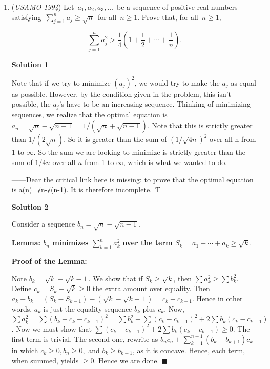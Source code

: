 \begin{enumerate}
 

 Because $CD=EF$ and $C$,$D$,$E$ and $F$ all lie on the circle, $CF$ is parallel to $DE$. So, $\triangle CPQ$ and $\triangle EPD$ are similar, and $CQ/DE=CP/PE$.

 Putting it all together, $\frac{CP}{PE}=\frac{CQ}{DE}=\frac{AC}{CE}\cdot \frac{QD}{DE}=(\frac{AC}{CE})^2$.

 Borrowed from \href{https://mks.mff.cuni.cz/kalva/usa/usoln/usol943.html}{https://mks.mff.cuni.cz/kalva/usa/usoln/usol943.html}

 


	\item (\textit{USAMO 1994}) Let $\, a_1, a_2, a_3, \ldots \,$ be a sequence of positive real numbers satisfying $\, \sum_{j = 1}^n a_j \geq \sqrt {n} \,$ for all $\, n \geq 1$. Prove that, for all $\, n \geq 1, \,$

 \[\sum_{j = 1}^n a_j^2 > \frac {1}{4} \left( 1 + \frac {1}{2} + \cdots + \frac {1}{n} \right).\]




\textbf{Solution 1}

Note that if we try to minimize $(a_j)^2$, we would try to make the $a_j$ as equal as possible. However, by the condition given in the problem, this isn't possible, the $a_j$'s have to be an increasing sequence. Thinking of minimizing sequences, we realize that the optimal equation is $a_n = \sqrt{n} - \sqrt{n-1} = 1/(\sqrt{n} + \sqrt{n-1})$. Note that this is strictly greater than $1/(2\sqrt{n})$. So it is greater than the sum of $(1/\sqrt{4n})^2$ over all n from 1 to $\infty$. So the sum we are looking to minimize is strictly greater than the sum of $1/4n$ over all $n$ from 1 to $\infty$, which is what we wanted to do.

 ——Dear the critical link here is missing: to prove that the optimal equation is a(n)=√n-√(n-1). It is therefore incomplete.~T

 



\textbf{Solution 2}

Consider a sequence $b_n = \sqrt{n} - \sqrt{n-1}$. 

 \textbf{Lemma: $b_n$ minimizes $\sum_{k=1}^n a_k^2$ over the term $S_k=a_1+\cdots+a_k\ge \sqrt{k}$}.

 \textbf{Proof of the Lemma:}

 Note $b_k=\sqrt{k}-\sqrt{k-1}$. We show that if $S_k\ge\sqrt{k}$, then $\sum a_k^2\ge\sum b_k^2$. Define $c_k=S_k-\sqrt{k}\ge0$ the extra amount over equality. Then $a_k-b_k=(S_k-S_{k-1})-(\sqrt{k}-\sqrt{k-1}) =c_k-c_{k-1}$. Hence in other words, $a_k$ is just the equality sequence $b_k$ plus $c_k$. Now, $\sum a_k^2=\sum(b_k+c_k-c_{k-1})^2 = \sum b_k^2 + \sum(c_k-c_{k-1})^2+2\sum b_k(c_k-c_{k-1})$. Now we must show that $\sum(c_k-c_{k-1})^2+2\sum b_k(c_k-c_{k-1}) \geq 0$. The first term is trivial. The second one, rewrite as $b_nc_n+\sum_{k=1}^{n-1}(b_k-b_{k+1})c_k$ in which $c_k \geq 0, b_n \geq 0,$ and $b_k \geq b_{k+1}$, as it is concave. Hence, each term, when summed, yields $\geq 0$. Hence we are done. $\blacksquare$


\end{enumerate}
